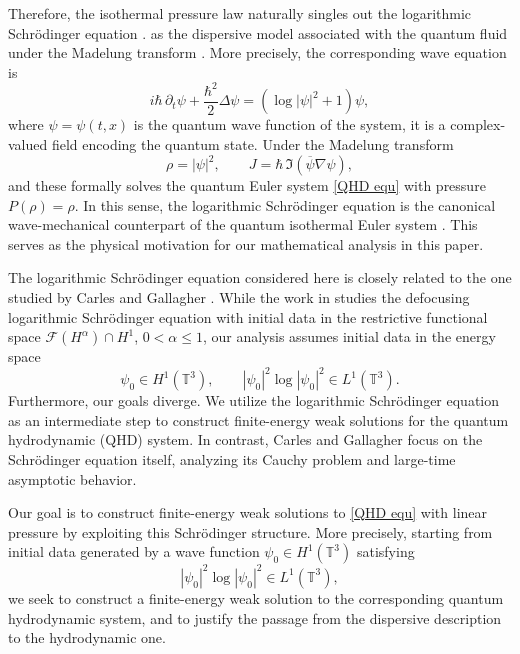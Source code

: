 \documentclass[11pt]{article}
\begin{document}
Therefore, the isothermal pressure law naturally singles out the logarithmic Schr\"odinger equation \cite{BialynickiBirulaMycielski1976,BialynickiBirulaMycielski1979,Carles2022Survey,Cazenave1983,CazenaveHaraux1980}. as the dispersive model associated with the quantum fluid under the Madelung transform \cite{Mad,CarlesDanchinSaut2012}. More precisely, the corresponding wave equation is
\begin{equation}
\label{SH equ}
i\hbar\,\partial_t\psi+\frac{\hbar^2}{2}\Delta\psi
=
(\log|\psi|^2+1)\psi,
\end{equation}
where $\psi=\psi(t,x)$ is the quantum wave function of the system, it  is a complex-valued field encoding the quantum state.
Under the Madelung transform \cite{Mad,CarlesDanchinSaut2012}
\[
\rho=|\psi|^2,
\qquad
J=\hbar\,\Im(\overline{\psi}\nabla\psi),\]
and  these formally solves the quantum Euler system \eqref{QHD equ} with pressure \(P(\rho)=\rho\).
In this sense, the logarithmic Schr\"odinger equation is the canonical wave-mechanical counterpart of the quantum isothermal Euler system \cite{Carles2022Survey,CarlesCarrapatosoHillairet2022}.
This serves as the physical motivation for our mathematical analysis in this paper.

\medskip


The logarithmic Schr\"odinger equation considered here is closely related to the one studied by Carles and Gallagher \cite{CarlesGallagher2018}. 
While the work in studies the defocusing logarithmic Schrödinger equation with initial data in the restrictive functional space
$\mathcal F(H^\alpha)\cap H^1$, $0<\alpha\le 1$,
our analysis assumes initial data in the energy space
\[
\psi_0\in H^1(\mathbb T^3),\qquad |\psi_0|^2\log |\psi_0|^2\in L^1(\mathbb T^3).
\]
Furthermore, our goals diverge. We utilize the logarithmic Schrödinger equation as an intermediate step to construct finite-energy weak solutions for the quantum hydrodynamic (QHD) system. In contrast, Carles and Gallagher \cite{CarlesGallagher2018}  focus on the Schrödinger equation itself, analyzing its Cauchy problem and large-time asymptotic behavior.

 


\medskip


Our goal is to construct finite-energy weak solutions to \eqref{QHD equ} with linear pressure by exploiting this Schr\"odinger structure. More precisely, starting from initial data generated by a wave function $\psi_0 \in H^1(\mathbb{T}^3)$ satisfying
\[
|\psi_0|^2 \log |\psi_0|^2 \in L^1(\mathbb{T}^3),
\]
we seek to construct a finite-energy weak solution to the corresponding quantum hydrodynamic system, and to justify the passage from the dispersive description to the hydrodynamic one.
\end{document}
